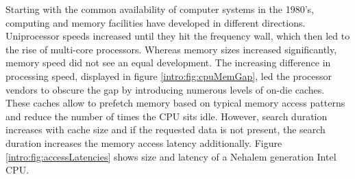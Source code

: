 Starting with the common availability of computer systems in the 1980's,
computing and memory facilities have developed in different directions.
Uniprocessor speeds increased until they hit the frequency wall, which then led
to the rise of multi-core processors.
Whereas memory sizes increased significantly, memory speed did not see an
equal development.
The increasing difference in processing speed, displayed in figure
\ref{intro:fig:cpuMemGap}, led the processor vendors to obscure the gap by
introducing numerous levels of on-die caches.
These caches allow to prefetch memory based on typical memory access patterns
and reduce the number of times the CPU sits idle.
However, search duration increases with cache size and if the requested data is
not present, the search duration increases the memory access latency additionally.
Figure \ref{intro:fig:accessLatencies} shows size and latency of a Nehalem
generation Intel CPU.

